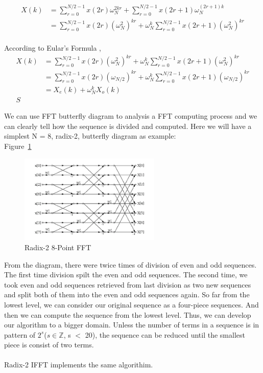 \documentclass[12pt]{article}
\begin{document}
\begin{align*} X(k) &= \sum\limits_{r=0}^{N/2 -1}x(2r)\omega_{N}^{2kr} +
\sum\limits_{r=0}^{N/2 -1}x(2r+1)\omega_{N}^{(2r+ 1)k}\\ & = \sum\limits_{r=0}^{N/2
-1}x(2r)(\omega_{N}^{2})^{kr} + \omega_{N}^{k}\sum\limits_{r=0}^{N/2
-1}x(2r+1)(\omega_{N}^{2})^{kr}\\ \end{align*}

According to Eular's Formula ,\\ 
\begin{align*} X(k) & = \sum\limits_{r=0}^{N/2 -1}x(2r)(\omega_{N}^{2})^{kr} +
\omega_{N}^{k}\sum\limits_{r=0}^{N/2 -1}x(2r+1)(\omega_{N}^{2})^{kr}\\ & =
\sum\limits_{r=0}^{N/2 -1}x(2r)(\omega_{N/2})^{kr} + \omega_{N}^{k}\sum\limits_{r=0}^{N/2
-1}x(2r+1)(\omega_{N/2})^{kr}\\ & = X_e(k) + \omega_N^kX_o(k)\\S \end{align*}

We can use FFT butterfly diagram to analysis a FFT computing process and we can
clearly tell how the sequence is divided and computed. Here we will have a
simplest N = 8, radix-2, butterfly diagram as example:\\

Figure~\ref{Fig_Radix-2FFT}

\begin{figure}[h!] \begin{center}
\includegraphics[width=0.6\textwidth]{butterflyRedix2} \caption{Radix-2 8-Point
FFT} \label{Fig_Radix-2FFT} \end{center} \end{figure}

From the diagram, there were twice times of division of even and odd sequences.
The first time division spilt the even and odd sequences. The second time, we
took even and odd sequences retrieved from last division as two new sequences
and split both of them into the even and odd sequences again. So far from the
lowest level, we can consider our original sequence as a four-piece sequences.
And then we can compute the sequence from the lowest level. Thus, we can develop
our algorithm to a bigger domain. Unless the number of terms in a sequence is in
pattern of $2^s$($s\in\mathbb{Z}$, s $<$ 20), the sequence can be reduced until
the smallest piece is consist of two terms.\\ \\ Radix-2 IFFT implements the
same algorithim.\\
\end{document}
